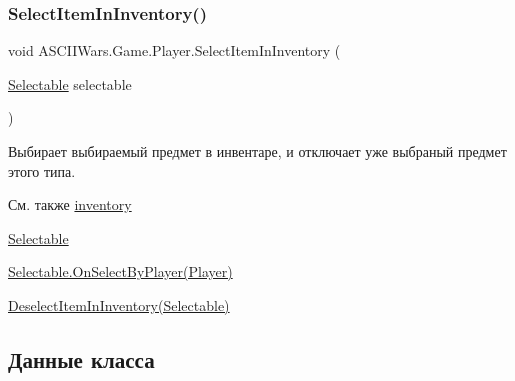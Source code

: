 \hypertarget{class_a_s_c_i_i_wars_1_1_game_1_1_player_aec1c1f808fa3da1585a62487b0e92a38}{}\label{class_a_s_c_i_i_wars_1_1_game_1_1_player_aec1c1f808fa3da1585a62487b0e92a38} 
\subsubsection{\texorpdfstring{Select\+Item\+In\+Inventory()}{SelectItemInInventory()}}
{\footnotesize\ttfamily void A\+S\+C\+I\+I\+Wars.\+Game.\+Player.\+Select\+Item\+In\+Inventory (\begin{DoxyParamCaption}\item[{\hyperlink{class_a_s_c_i_i_wars_1_1_game_1_1_selectable}{Selectable}}]{selectable }\end{DoxyParamCaption})\hspace{0.3cm}{\ttfamily [inline]}}



Выбирает выбираемый предмет в инвентаре, и отключает уже выбраный предмет этого типа. 

\begin{DoxySeeAlso}{См. также}
\hyperlink{class_a_s_c_i_i_wars_1_1_game_1_1_player_a04acfaa196162f89bfae7aee5ec45480}{inventory} 

\hyperlink{class_a_s_c_i_i_wars_1_1_game_1_1_selectable}{Selectable} 

\hyperlink{class_a_s_c_i_i_wars_1_1_game_1_1_selectable_a95bdcf05ef9ea5f39c81ddd96294968a}{Selectable.\+On\+Select\+By\+Player(\+Player)} 

\hyperlink{class_a_s_c_i_i_wars_1_1_game_1_1_player_a104ae32d59b6e627d55dc78ff4ffa995}{Deselect\+Item\+In\+Inventory(\+Selectable)} 
\end{DoxySeeAlso}


\subsection{Данные класса}
\hypertarget{class_a_s_c_i_i_wars_1_1_game_1_1_player_a45736ed2f9941e3877df09db83cd4032}{}\label{class_a_s_c_i_i_wars_1_1_game_1_1_player_a45736ed2f9941e3877df09db83cd4032} 
